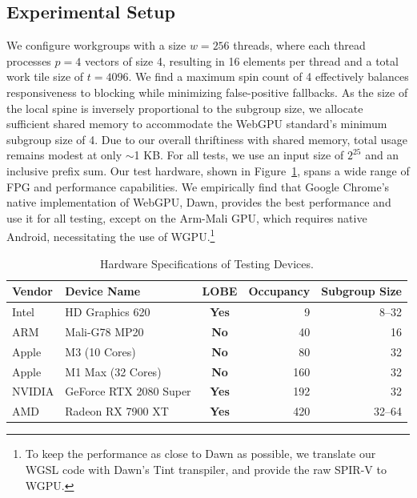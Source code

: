 \documentclass[acmsmall, manuscript, screen, review, anonymous]{acmart}
\begin{document}
\subsection{Experimental Setup}
We configure workgroups with a size $w = 256$ threads, where each thread processes $p = 4$ vectors of size 4, resulting in 16 elements per thread and a total work tile size of $t = 4096$. We find a maximum spin count of 4 effectively balances responsiveness to blocking while minimizing false-positive fallbacks. As the size of the local spine is inversely proportional to the subgroup size, we allocate sufficient shared memory to accommodate the WebGPU standard's minimum subgroup size of 4. Due to our overall thriftiness with shared memory, total usage remains modest at only $\sim$1 KB\@. For all tests, we use an input size of $2^{25}$ and an inclusive prefix sum. Our test hardware, shown in Figure~\ref{tab:hardware}, spans a wide range of FPG and performance capabilities. We empirically find that Google Chrome's native implementation of WebGPU, Dawn, provides the best performance and use it for all testing, except on the Arm-Mali GPU, which requires native Android, necessitating the use of WGPU\@.\footnote{To keep the performance as close to Dawn as possible, we translate our WGSL code with Dawn's Tint transpiler, and provide the raw SPIR-V to WGPU\@.}
\begin{table}
  \centering
  \begin{tabular}{l l c r r}
    \toprule
    Vendor & Device Name            & LOBE         & Occupancy & Subgroup Size \\
    \midrule
    Intel  & HD Graphics 620        & \textbf{Yes} & 9         & 8--32         \\
    ARM    & Mali-G78 MP20          & \textbf{No}  & 40        & 16            \\
    Apple  & M3     (10 Cores)      & \textbf{No}  & 80        & 32            \\
    Apple  & M1 Max (32 Cores)      & \textbf{No}  & 160       & 32            \\
    NVIDIA & GeForce RTX 2080 Super & \textbf{Yes} & 192       & 32            \\
    AMD    & Radeon RX 7900 XT      & \textbf{Yes} & 420       & 32--64        \\
    \bottomrule
  \end{tabular}
  \caption{Hardware Specifications of Testing Devices.\label{tab:hardware}}
\end{table}
\end{document}
